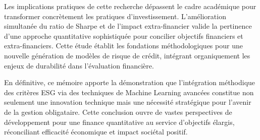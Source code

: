 Les implications pratiques de cette recherche dépassent le cadre académique pour transformer concrètement les pratiques d'investissement. L'amélioration simultanée du ratio de Sharpe et de l'impact extra-financier valide la pertinence d'une approche quantitative sophistiquée pour concilier objectifs financiers et extra-financiers. Cette étude établit les fondations méthodologiques pour une nouvelle génération de modèles de risque de crédit, intégrant organiquement les enjeux de durabilité dans l'évaluation financière.

En définitive, ce mémoire apporte la démonstration que l'intégration méthodique des critères ESG via des techniques de Machine Learning avancées constitue non seulement une innovation technique mais une nécessité stratégique pour l'avenir de la gestion obligataire. Cette conclusion ouvre de vastes perspectives de développement pour une finance quantitative au service d'objectifs élargis, réconciliant efficacité économique et impact sociétal positif.